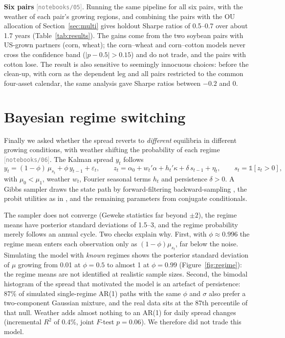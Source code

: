 \documentclass[11pt,a4paper]{article}
\newcommand{\nb}[1]{\textcolor{gray}{\small[\texttt{notebooks/#1}]}}
\begin{document}
\textbf{Six pairs} \nb{05}. Running the same pipeline for all six pairs, with the weather of each pair's growing
regions, and combining the pairs with the OU allocation of Section~\ref{sec:multi} gives holdout Sharpe ratios of
0.5--0.7 over about 1.7 years (Table~\ref{tab:results}). The gains come from the two soybean pairs with US-grown
partners (corn, wheat); the corn--wheat and corn--cotton models never cross the confidence band ($|p-0.5|>0.15$) and do
not trade, and the pairs with cotton lose. The result is also sensitive to seemingly innocuous choices: before the
clean-up, with corn as the dependent leg and all pairs restricted to the common four-asset calendar, the same analysis
gave Sharpe ratios between $-0.2$ and 0.

\section{Bayesian regime switching}\label{sec:regime}
Finally we asked whether the spread reverts to \emph{different} equilibria in different growing conditions, with
weather shifting the probability of each regime \nb{06}. The Kalman spread $y_t$ follows
\begin{equation*}
y_t=(1-\phi)\,\mu_{s_t}+\phi\,y_{t-1}+\varepsilon_t,\qquad
z_t=\alpha_0+w_t'\alpha+h_t'\kappa+\delta\,s_{t-1}+\eta_t,\qquad s_t=\mathbb{1}[z_t>0],
\end{equation*}
with $\mu_0<\mu_1$, weather $w_t$, Fourier seasonal terms $h_t$ and persistence $\delta>0$. A Gibbs sampler draws the
state path by forward-filtering backward-sampling \citep{carterkohn1994}, the probit utilities as in
\citet{albertchib1993}, and the remaining parameters from conjugate conditionals.

The sampler does not converge (Geweke statistics far beyond $\pm2$), the regime means have posterior standard
deviations of 1.5--3, and the regime probability merely follows an annual cycle. Two checks explain why. First, with $\phi\approx0.996$ the regime mean enters each observation only as
$(1-\phi)\mu_{s_t}$, far below the noise. Simulating the model with \emph{known} regimes shows the posterior standard
deviation of $\mu$ growing from 0.01 at $\phi=0.5$ to almost 1 at $\phi=0.99$ (Figure~\ref{fig:regime}): the regime
means are not identified at realistic sample sizes. Second, the bimodal histogram of the spread that motivated the
model is an artefact of persistence: 87\% of simulated single-regime AR(1) paths with the same $\phi$ and $\sigma$ also
prefer a two-component Gaussian mixture, and the real data sits at the 87th percentile of that null. Weather adds
almost nothing to an AR(1) for daily spread changes (incremental $R^2$ of 0.4\%, joint $F$-test $p=0.06$). We therefore
did not trade this model.
\end{document}
